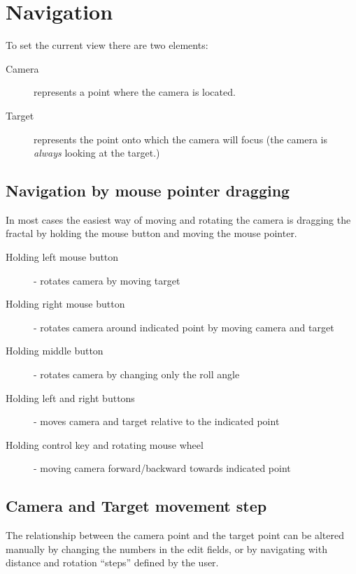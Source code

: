 \section{Navigation}\label{navigation}

To set the current view there are two elements:

\begin{description}
	\item[Camera] represents a point where the camera is located.
	\item[Target] represents the point onto which the camera will focus (the
	camera is \emph{always} looking at the target.)
\end{description}

\subsection{Navigation by mouse pointer dragging}\label{navigation-by-mouse-pointer-dragging} 

In most cases the easiest way of moving and rotating the camera is dragging the fractal by holding the mouse button and moving the mouse pointer.

\begin{description}
	\item[Holding left mouse button] - rotates camera by moving target
	\item[Holding right mouse button] - rotates camera around indicated point by moving camera and target
	\item[Holding middle button] - rotates camera by changing only the roll angle
	\item[Holding left and right buttons] - moves camera and target relative to the indicated point
	\item[Holding control key and rotating mouse wheel] - moving camera forward/backward towards indicated point
\end{description}

\subsection{Camera and Target movement
	step}\label{camera-and-target-movement-step}

The relationship between the camera point and the target point can be altered
manually by changing the numbers in the edit fields, or by navigating with
distance and rotation ``steps'' defined by the user.

